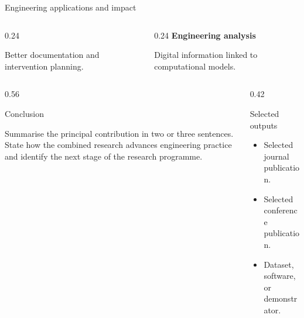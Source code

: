 \documentclass[final]{beamer}
\begin{document}
\begin{frame}[t]
\begin{exampleblock}{Engineering applications and impact}
\begin{columns}[t,totalwidth=\linewidth]
\begin{column}{0.24\linewidth}
            \vspace{0.2cm}

            Better documentation and
            intervention planning.
        \end{column}

        \begin{column}{0.24\linewidth}
            \centering
            \textbf{Engineering analysis}

            \vspace{0.2cm}

            Digital information linked
            to computational models.
        \end{column}

    \end{columns}

\end{exampleblock}

\vspace{0.45cm}

\begin{columns}[t,totalwidth=\textwidth]

    \begin{column}{0.56\textwidth}

        \begin{alertblock}{Conclusion}
            \justifying

            Summarise the principal contribution in two or three
            sentences. State how the combined research advances
            engineering practice and identify the next stage of the
            research programme.
        \end{alertblock}

    \end{column}

    \begin{column}{0.42\textwidth}

        \begin{block}{Selected outputs}
            \justifying

            \begin{itemize}
                \item Selected journal publication.
                \item Selected conference publication.
                \item Dataset, software, or demonstrator.
            \end{itemize}
        \end{block}


\end{column}
\end{columns}
\end{frame}
\end{document}
